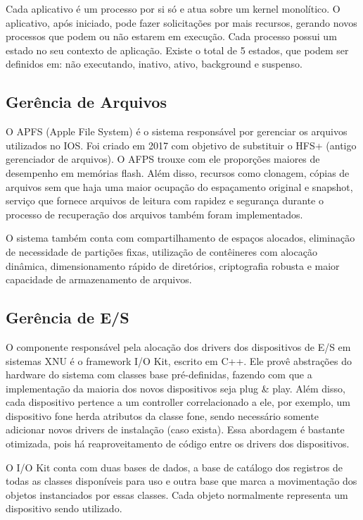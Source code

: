 \documentclass[conference]{IEEEtran}
\begin{document}
Cada aplicativo é um processo por si só e atua sobre um kernel monolítico. O aplicativo, após iniciado, pode fazer solicitações por mais recursos, gerando novos processos que podem ou não estarem em execução. Cada processo possui um estado no seu contexto de aplicação. Existe o total de 5 estados, que podem ser definidos em: não executando, inativo, ativo, background e suspenso. %

\subsection{Gerência de Arquivos} %
O APFS (Apple File System) é o sistema responsável por gerenciar os arquivos utilizados no IOS. Foi criado em 2017 com objetivo de substituir o HFS+ (antigo gerenciador de arquivos). O AFPS trouxe com ele proporções maiores de desempenho em memórias flash. Além disso, recursos como clonagem, cópias de arquivos sem que haja uma maior ocupação do espaçamento original e snapshot, serviço que fornece arquivos de leitura com rapidez e segurança durante o processo de recuperação dos arquivos também foram implementados.

O sistema também conta com compartilhamento de espaços alocados, eliminação de necessidade de partições fixas, utilização de contêineres com alocação dinâmica, dimensionamento rápido de diretórios, criptografia robusta e maior capacidade de armazenamento de arquivos.


\subsection{Gerência de E/S} %
O componente responsável pela alocação dos drivers dos dispositivos de E/S em sistemas XNU é o framework I/O Kit, escrito em C++. Ele provê abstrações do hardware do sistema com classes base pré-definidas, fazendo com que a implementação da maioria dos novos dispositivos seja plug \& play. Além disso, cada dispositivo pertence a um controller correlacionado a ele, por exemplo, um dispositivo fone herda atributos da classe fone, sendo necessário somente adicionar novos drivers de instalação (caso exista). Essa abordagem é bastante otimizada, pois há reaproveitamento de código entre os drivers dos dispositivos.

O I/O Kit conta com duas bases de dados, a base de catálogo dos registros de todas as classes disponíveis para uso e outra base que marca a movimentação dos objetos instanciados por essas classes. Cada objeto normalmente representa um dispositivo sendo utilizado.
\end{document}
